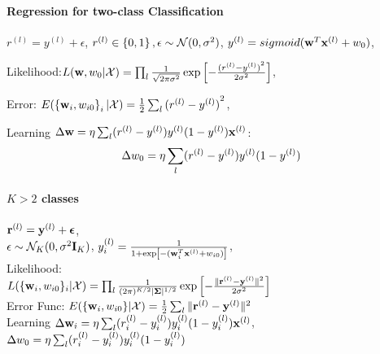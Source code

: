     \paragraph{Regression for two-class Classification} $r^{(l)} = y^{(l)}+\epsilon$,
        $r^{(l)}\in \left\{ 0,1 \right\}, \epsilon \sim \mathcal{N}(0, \sigma^2)$,
        $y^{(l)} = sigmoid(\mathbf{w}^T\mathbf{x}^{(l)}+w_0)$,

        Likelihood:$L(\mathbf{w}, w_0|\mathcal{X}) =
        \prod_l\frac{1}{\sqrt{2\pi\sigma^2}}\exp\left[
        -\frac{{(r^{(l)}-y^{(l)})}^2}{2\sigma^2} \right]$, 

        Error: $E(\left\{ \mathbf{w}_i, w_{i0} \right\}_i|\mathcal{X}) =
        \frac{1}{2}\sum_l{(r^{(l)}-y^{(l)})}^2$, 

        Learning $\Delta \mathbf{w} = \eta\sum_l(r^{(l)} - y^{(l)})y^{(l)}(1-y^{(l)})\mathbf{x}^{(l)}$:
        \[\Delta w_0 = \eta\sum_l(r^{(l)}-y^{(l)})y^{(l)}(1-y^{(l)})\]
    \paragraph{$K>2$ classes} $\mathbf{r}^{(l)} = \mathbf{y}^{(l)} +\boldsymbol\epsilon$, \\$\epsilon\sim
        \mathcal{N}_K(0, \sigma^2\mathbf{I}_K)$, $y^{(l)}_i = \frac{1}{1+\exp\left[
            -(\mathbf{w}_i^T\mathbf{x}^{(l)} + w_{i0})
        \right]}$, \\
        Likelihood:\\$L(\{\mathbf{w}_i, w_{i0}\}_i|\mathcal{X}) =
        \prod_l\frac{1}{(2\pi)^{K/2}|\boldsymbol\Sigma|^{1/2}}\exp\left[ -\frac{\|\mathbf{r}^{(l)} -
        \mathbf{y}^{(l)}\|^2}{2\sigma^2} \right]$\\
        Error Func: $E(\{\mathbf{w}_i, w_{i0}\}|\mathcal{X}) =
        \frac{1}{2}\sum_l\|\mathbf{r}^{(l)}-\mathbf{y}^{(l)}\|^2$\\
        Learning $\Delta \mathbf{w}_i = \eta\sum_l(r^{(l)}_i - y^{(l)}_i)y^{(l)}_i(1-y^{(l)}_i)\mathbf{x}^{(l)}$,\\ $\Delta
        w_0 = \eta\sum_l(r^{(l)}_i-y^{(l)}_i)y^{(l)}_i(1-y^{(l)}_i)$
